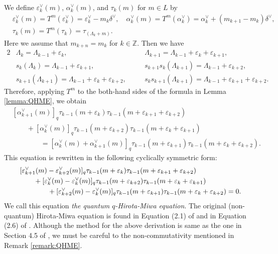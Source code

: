 \documentclass[12pt,twoside]{article}
\newcommand\av{\alpha^\vee}
\newcommand\eps{\varepsilon}
\newcommand\epsv{\eps^\vee}
\newcommand\deltav{\delta^\vee}
\newcommand\Z{{\mathbb Z}} %
\theoremstyle{plain} %
\theoremstyle{definition} %
\theoremstyle{definition} %
\numberwithin{theorem}{section}
\numberwithin{equation}{section}
\numberwithin{figure}{section}
\numberwithin{table}{section}
\newcommand\lemmaref[1]{Lemma \ref{#1}}
\newcommand\remarkref[1]{Remark \ref{#1}}
\begin{document}
We define $\epsv_k(m)$, $\av_k(m)$, and $\tau_k(m)$ for $m\in L$ by
\begin{align*}
 &
 \epsv_k(m) = T^m(\epsv_k) = \epsv_k - m_k\deltav, 
 \quad
 \av_k(m)=T^m(\av_k)=\av_k+(m_{k+1}-m_k)\deltav,
 \\ &
 \tau_k(m) = T^m(\tau_k) = \tau_{(\Lambda_k+m)}.
\end{align*}
Here we assume that $m_{k+n}=m_k$ for $k\in\Z$.
Then we have
\begin{alignat*}{2}
&
\Lambda_k = \Lambda_{k-1}+\eps_k, \quad
& &
\Lambda_{k+1} = \Lambda_{k-1}+\eps_k+\eps_{k+1}, 
\\ &
s_k(\Lambda_k) = \Lambda_{k-1}+\eps_{k+1}, \quad
& &
s_{k+1}s_k(\Lambda_{k+1}) = \Lambda_{k-1}+\eps_{k+2},
\\ &
s_{k+1}(\Lambda_{k+1}) = \Lambda_{k-1}+\eps_k+\eps_{k+2}, \quad
& &
s_k s_{k+1}(\Lambda_{k+1}) = \Lambda_{k-1}+\eps_{k+1}+\eps_{k+2}.
\end{alignat*}
Therefore, applying $T^m$ to the both-hand sides of the formula in \lemmaref{lemma:QHME},
we obtain
\begin{align*}
 &
   [\av_{k+1}(m)]_q \tau_{k-1}(m+\eps_k)     \tau_{k-1}(m+\eps_{k+1}+\eps_{k+2})
 \\ & \qquad
 + [\av_k(m)]_q     \tau_{k-1}(m+\eps_{k+2}) \tau_{k-1}(m+\eps_k+\eps_{k+1})
 \\ & \qquad\qquad
 = [\av_k(m)+\av_{k+1}(m)]_q \tau_{k-1}(m+\eps_{k+1}) \tau_{k-1}(m+\eps_k+\eps_{k+2}).
\end{align*}
This equation is rewritten in the following cyclically symmetric form:
\begin{align}
 &
   [\epsv_{k+1}(m)-\epsv_{k+2}(m)]_q \tau_{k-1}(m+\eps_k)     \tau_{k-1}(m+\eps_{k+1}+\eps_{k+2})
 \notag
 \\ & \qquad
 + [\epsv_k(m)-\epsv_k(m)]_q          \tau_{k-1}(m+\eps_{k+2}) \tau_{k-1}(m+\eps_k+\eps_{k+1})
 \label{eq:QHME}
 \\ & \qquad\qquad
 + [\epsv_{k+2}(m)-\epsv_k(m)]_q     \tau_{k-1}(m+\eps_{k+1}) \tau_{k-1}(m+\eps_k+\eps_{k+2})
 =0.
 \notag
\end{align}
We call this equation {\em the quantum $q$-Hirota-Miwa equation}.
The original (non-quantum) Hirota-Miwa equation is found in  
Equation (2.1) of \cite{Hirota} and in Equation (2.6) of \cite{Miwa}.
Although the method for the above derivation is same as 
the one in Section 4.5 of \cite{Noumi},
we must be careful to the non-commutativity mentioned in \remarkref{remark:QHME}.
\end{document}
